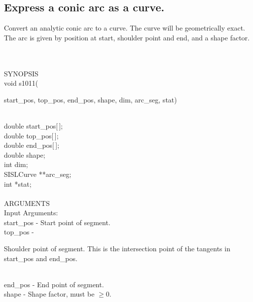 \subsection{Express a conic arc as a curve.}
\begin{minipg1}
  Convert an analytic conic arc to a curve.
  The curve will be geometrically exact.
  The arc is given by position at start, shoulder point and end, and a
  shape factor.
\end{minipg1} \\ \\
SYNOPSIS\\
        \>void s1011(\begin{minipg3}
          {\fov start\_pos},  {\fov top\_pos},  {\fov end\_pos},  {\fov shape},  {\fov dim},  {\fov arc\_seg},  {\fov stat})
        \end{minipg3}\\[0.3ex]
        \>\>    double \> {\fov start\_pos}[\,];\\
        \>\>    double \> {\fov top\_pos}[\,];\\
        \>\>    double \> {\fov end\_pos}[\,];\\
        \>\>    double \> {\fov shape};\\
        \>\>    int    \> {\fov dim};\\
        \>\>    SISLCurve \> **{\fov arc\_seg};\\
        \>\>    int    \> *{\fov stat};\\
\\
ARGUMENTS\\
        \>Input Arguments:\\
        \>\>    {\fov start\_pos} \> - \> Start point of segment.\\
        \>\>    {\fov top\_pos}   \> - \> \begin{minipg2}
                                            Shoulder point of
                                            segment. This is the
                                            intersection point of the
                                            tangents in {\fov start\_pos} and
                                            {\fov end\_pos}.
                                          \end{minipg2}\\[0.8ex]
        \>\>    {\fov end\_pos}   \> - \> End point of segment.\\
        \>\>    {\fov shape}      \> - \> Shape factor, must be $\geq 0$.\\
